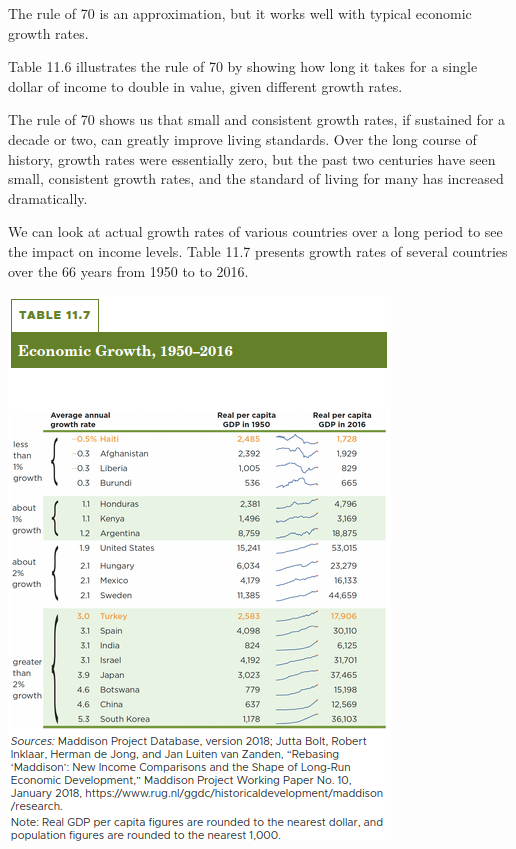 \documentclass[11pt]{article} %
\begin{document}
The rule of 70 is an approximation, but it works well with typical economic growth rates.

Table 11.6 illustrates the rule of 70 by showing how long it takes for a single dollar of income to double in value, given different growth rates.

The rule of 70 shows us that small and consistent growth rates, if sustained for a decade or two, can greatly improve living standards. Over the long course of history, growth rates were essentially zero, but the past two centuries have seen small, consistent growth rates, and the standard of living for many has increased dramatically.

We can look at actual growth rates of various countries over a long period to see the impact on income levels. Table 11.7 presents growth rates of several countries over the 66 years from 1950 to to 2016.

\begin{center}
\includegraphics[scale=0.5]{../../images/Chapter 11/Table 11.7 .png}
\end{center}
\end{document}
